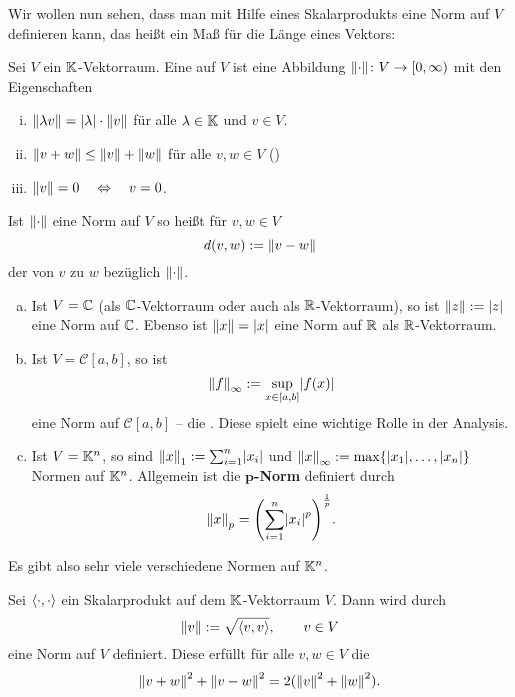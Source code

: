 Wir wollen nun sehen, dass man mit Hilfe eines Skalarprodukts eine Norm auf $V$ definieren kann, das heißt ein Maß für die Länge eines Vektors:

\begin{definition}[Norm]
	\label{def:3.5}
	Sei $V$ ein $\mathbb{K}$-Vektorraum.
	Eine  auf $V$ ist eine Abbildung $\lVert\cdot\rVert \colon V \rightarrow [0,\infty)$	mit den Eigenschaften
	\begin{enumerate}[(i)]
		\item $\left\lVert\lambda v\right\rVert = \left\lvert\lambda\right\rvert \cdot \left\lVert v\right\rVert$ für alle $\lambda \in \mathbb{K}$ und $v \in V$.
		\item $\left\lVert v+w\right\rVert \leq \left\lVert v\right\rVert + \left\lVert w\right\rVert$ für alle $v,w \in V$ ()
		\item $\left\lVert v\right\rVert = 0 \quad \Leftrightarrow \quad v = 0$.
	\end{enumerate}
	Ist $\left\lVert\cdot\right\rVert$ eine Norm auf $V$ so heißt für $v,w \in V$
	\[
		d(v,w) := \left\lVert v-w\right\rVert
	\]
	der  von $v$ zu $w$ bezüglich $\left\lVert\cdot\right\rVert$.
\end{definition}

\begin{beispiel}
	\label{bsp:3.6}
	\begin{enumerate}[(a)]
		\item Ist $V = \mathbb{C}$ (als $\mathbb{C}$-Vektorraum oder auch als $\mathbb{R}$-Vektorraum), so ist $\left\lVert z\right\rVert := \left\lvert z\right\rvert$ eine Norm auf $\mathbb{C}$.
		Ebenso ist $\left\lVert x\right\rVert = \left\lvert x\right\rvert$ eine Norm auf $\mathbb{R}$ als $\mathbb{R}$-Vektorraum.
		\item Ist $V = \mathcal{C}[a,b]$, so ist
		\[
			\no{f}_{\infty} := \sup_{x \in [a,b]} \abs{f(x)}
		\]
		eine Norm auf $\mathcal{C}[a,b]$ -- die .
		Diese spielt eine wichtige Rolle in der Analysis.
		\item Ist $V = \mathbb{K}^n$, so sind $\no{x}_1 := \sum_{i=1}^{n} \abs{x_i}$ und $\no{x}_\infty := \max\{ \abs{x_1},\dots,\abs{x_n}\}$ Normen auf $\mathbb{K}^n$. Allgemein ist die $\mathbf{p}$\textbf{-Norm} definiert durch 
		\[
			\no{x}_p = \enb{\sum_{i=1}^{n} \abs{x_i}^p}^{\frac{1}{p}}.
		\]
	\end{enumerate}
	Es gibt also sehr viele verschiedene Normen auf $\mathbb{K}^n$.
\end{beispiel}

\begin{satz}
	\label{satz:3.7}
	Sei $\left\langle\cdot,\cdot\right\rangle$ ein Skalarprodukt auf dem $\mathbb{K}$-Vektorraum $V$.
	Dann wird durch
	\[
		\left\lVert v\right\rVert := \sqrt{\left\langle v,v\right\rangle}, \qquad v \in V
	\]
	eine Norm auf $V$ definiert.
	Diese erfüllt für alle $v,w \in V$ die 
	\[
		\left\lVert v+w\right\rVert^2 + \left\lVert v-w\right\rVert^2 = 2 (\left\lVert v\right\rVert^2 + \left\lVert w\right\rVert^2).
	\]
\end{satz}	
	
